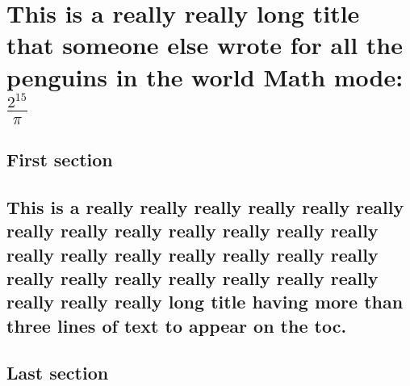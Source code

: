 \chapter{This is a really really long title that someone else wrote for all the penguins in the world Math mode: $\frac{2^{15}}{\pi}$}
\lipsum[2]

\section{First section }
\lipsum[3]

\section{This is a really really really really really really really really really really really really really really really really really really really really really really really really really really really really really really long title having more than three lines of text to appear on the toc.}
\lipsum[3-4]

\section{Last section} 
\lipsum[4]
